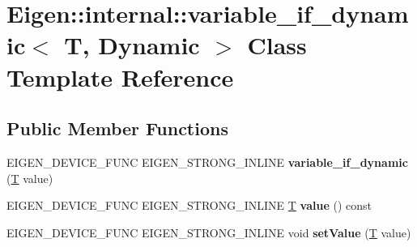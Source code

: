 \hypertarget{class_eigen_1_1internal_1_1variable__if__dynamic_3_01_t_00_01_dynamic_01_4}{}\section{Eigen\+:\+:internal\+:\+:variable\+\_\+if\+\_\+dynamic$<$ T, Dynamic $>$ Class Template Reference}
\label{class_eigen_1_1internal_1_1variable__if__dynamic_3_01_t_00_01_dynamic_01_4}
\subsection*{Public Member Functions}
\begin{DoxyCompactItemize}
\item 
\mbox{\label{class_eigen_1_1internal_1_1variable__if__dynamic_3_01_t_00_01_dynamic_01_4_a5f4b62fe0e834f5d7373f4d347c56bc0}} 
E\+I\+G\+E\+N\+\_\+\+D\+E\+V\+I\+C\+E\+\_\+\+F\+U\+NC E\+I\+G\+E\+N\+\_\+\+S\+T\+R\+O\+N\+G\+\_\+\+I\+N\+L\+I\+NE {\bfseries variable\+\_\+if\+\_\+dynamic} (\hyperlink{group___sparse_core___module}{T} value)
\item 
\mbox{\label{class_eigen_1_1internal_1_1variable__if__dynamic_3_01_t_00_01_dynamic_01_4_a888489cd207291bb18a71545f94a7529}} 
E\+I\+G\+E\+N\+\_\+\+D\+E\+V\+I\+C\+E\+\_\+\+F\+U\+NC E\+I\+G\+E\+N\+\_\+\+S\+T\+R\+O\+N\+G\+\_\+\+I\+N\+L\+I\+NE \hyperlink{group___sparse_core___module}{T} {\bfseries value} () const
\item 
\mbox{\label{class_eigen_1_1internal_1_1variable__if__dynamic_3_01_t_00_01_dynamic_01_4_a8557515f971577b2e7949a69577513fd}} 
E\+I\+G\+E\+N\+\_\+\+D\+E\+V\+I\+C\+E\+\_\+\+F\+U\+NC E\+I\+G\+E\+N\+\_\+\+S\+T\+R\+O\+N\+G\+\_\+\+I\+N\+L\+I\+NE void {\bfseries set\+Value} (\hyperlink{group___sparse_core___module}{T} value)
\item 
\mbox{\label{class_eigen_1_1internal_1_1variable__if__dynamic_3_01_t_00_01_dynamic_01_4_a5f4b62fe0e834f5d7373f4d347c56bc0}} 

\end{DoxyCompactItemize}
